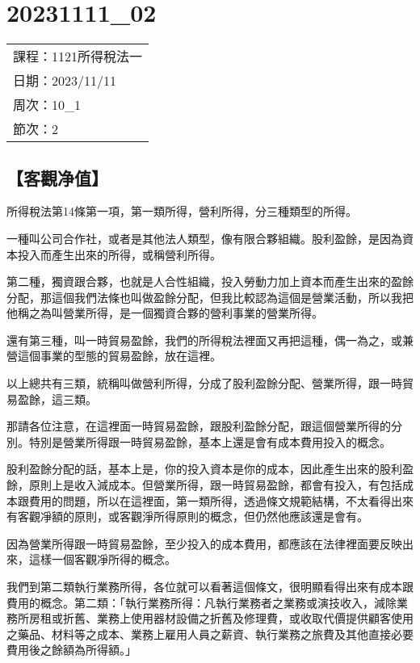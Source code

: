 \documentclass[]{ctexbook}
\begin{document}
\hypertarget{section-20}{%
\chapter{20231111\_02}\label{section-20}}

\begin{longtable}[]{@{}l@{}}
\toprule()
\endhead
課程：1121所得稅法一 \\
日期：2023/11/11 \\
周次：10\_1 \\
節次：2 \\
\bottomrule()
\end{longtable}

\hypertarget{ux5ba2ux89c0ux51c0ux503c}{%
\section{【客觀净值】}\label{ux5ba2ux89c0ux51c0ux503c}}

所得稅法第14條第一項，第一類所得，營利所得，分三種類型的所得。

一種叫公司合作社，或者是其他法人類型，像有限合夥組織。股利盈餘，是因為資本投入而產生出來的所得，或稱營利所得。

第二種，獨資跟合夥，也就是人合性組織，投入勞動力加上資本而產生出來的盈餘分配，那這個我們法條也叫做盈餘分配，但我比較認為這個是營業活動，所以我把他稱之為叫營業所得，是一個獨資合夥的營利事業的營業所得。

還有第三種，叫一時貿易盈餘，我們的所得稅法裡面又再把這種，偶一為之，或兼營這個事業的型態的貿易盈餘，放在這裡。

以上總共有三類，統稱叫做營利所得，分成了股利盈餘分配、營業所得，跟一時貿易盈餘，這三類。

那請各位注意，在這裡面一時貿易盈餘，跟股利盈餘分配，跟這個營業所得的分別。特別是營業所得跟一時貿易盈餘，基本上還是會有成本費用投入的概念。

股利盈餘分配的話，基本上是，你的投入資本是你的成本，因此產生出來的股利盈餘，原則上是收入減成本。但營業所得，跟一時貿易盈餘，都會有投入，有包括成本跟費用的問題，所以在這裡面，第一類所得，透過條文規範結構，不太看得出來有客觀凈額的原則，或客觀淨所得原則的概念，但仍然他應該還是會有。

因為營業所得跟一時貿易盈餘，至少投入的成本費用，都應該在法律裡面要反映出來，這樣一個客觀凈所得的概念。

我們到第二類執行業務所得，各位就可以看著這個條文，很明顯看得出來有成本跟費用的概念。第二類：「執行業務所得：凡執行業務者之業務或演技收入，減除業務所房租或折舊、業務上使用器材設備之折舊及修理費，或收取代價提供顧客使用之藥品、材料等之成本、業務上雇用人員之薪資、執行業務之旅費及其他直接必要費用後之餘額為所得額。」
\end{document}
